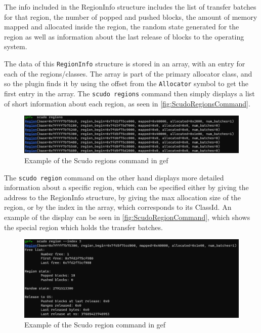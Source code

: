 \documentclass[a4paper,11pt,oneside]{report}
\begin{document}
The info included in the RegionInfo structure includes the list of transfer
batches for that region, the number of popped and pushed blocks, the amount
of memory mapped and allocated inside the region, the random state generated
for the region as well as information about the last release of blocks to
the operating system.

The data of this \verb|RegionInfo| structure is stored in an array, with an entry
for each of the regions/classes. The array is part of the primary allocator
class, and so the plugin finds it by using the offset from the \verb|Allocator|
symbol to get the first entry in the array.
The \verb|scudo regions| command then simply displays a list of short information
about each region, as seen in \autoref{fig:ScudoRegionsCommand}.

\begin{figure}[h!]
  \centering
  \includegraphics[width=\linewidth]{figures/ScudoRegionsCommand.png}
  \caption{Example of the Scudo regions command in gef}
  \label{fig:ScudoRegionsCommand}
\end{figure}

The \verb|scudo region| command on the other hand displays more detailed information
about a specific region, which can be specified either by giving the address
to the RegionInfo structure, by giving the max allocation size of the region,
or by the index in the array, which corresponds to its ClassId. An example of
the display can be seen in \autoref{fig:ScudoRegionCommand}, which shows the
special region which holds the transfer batches.

\begin{figure}[h!]
  \centering
  \includegraphics[width=\linewidth]{figures/ScudoRegionCommand.png}
  \caption{Example of the Scudo region command in gef}
  \label{fig:ScudoRegionCommand}
\end{figure}
\end{document}
